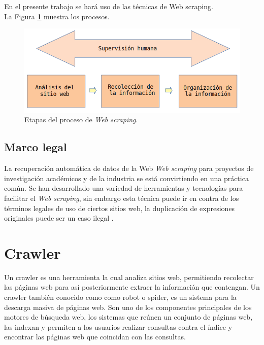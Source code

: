 En el presente trabajo se hará uso de las técnicas de Web scraping.\\
La Figura \textbf{\ref{fig:procesos}} muestra los procesos.

\begin{figure}[H]
    \centering
    \includegraphics[scale=.35]{imagenes/Capitulo5/procesos}
    \caption{Etapas del proceso de \textit{Web scraping}.}
    \label{fig:procesos}
  \end{figure}
  

\subsection{Marco legal}

La recuperación automática de datos de la Web \textit{Web scraping} para proyectos de investigación académicos y de la 
industria se está convirtiendo en una práctica común. Se han desarrollado una variedad de herramientas y tecnologías 
para facilitar el \textit{Web scraping}, sin embargo esta técnica puede ir en contra de los términos legales 
de uso de ciertos sitios web, la duplicación de expresiones originales puede ser un caso ilegal \citep{CTMarco}.


\section{Crawler}

Un crawler \citep{CTCrawler} es una herramienta la cual analiza sitios web, permitiendo recolectar 
las páginas web para así posteriormente extraer la información que contengan. Un crawler también 
conocido como como robot o spider, es un sistema para la descarga masiva de páginas web. Son uno de 
los componentes principales de los motores de búsqueda web, los sistemas que reúnen un conjunto de 
páginas web, las indexan y permiten a los usuarios realizar consultas contra el índice y encontrar las 
páginas web que coincidan con las consultas.


